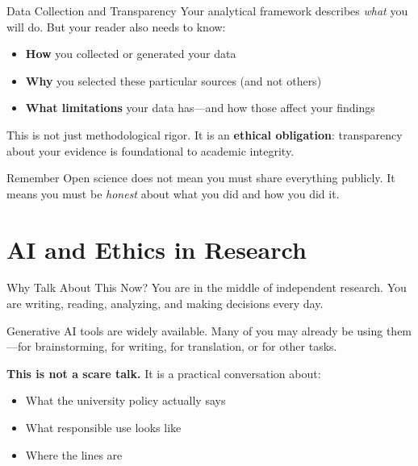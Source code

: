 \documentclass[aspectratio=169,11pt]{beamer}
\begin{document}
\begin{frame}{Data Collection and Transparency}
    Your analytical framework describes \textit{what} you will do. But your reader also needs to know:
    \vspace{0.3cm}
    \begin{itemize}
        \item \textbf{How} you collected or generated your data
        \item \textbf{Why} you selected these particular sources (and not others)
        \item \textbf{What limitations} your data has---and how those affect your findings
    \end{itemize}
    \vspace{0.3cm}
    This is not just methodological rigor. It is an \textbf{ethical obligation}: transparency about your evidence is foundational to academic integrity.
    \vspace{0.3cm}
    \begin{exampleblock}{Remember}
        Open science does not mean you must share everything publicly. It means you must be \textit{honest} about what you did and how you did it.
    \end{exampleblock}
\end{frame}

\section{AI and Ethics in Research}

\begin{frame}{Why Talk About This Now?}
    You are in the middle of independent research. You are writing, reading, analyzing, and making decisions every day.
    \vspace{0.5cm}

    Generative AI tools are widely available. Many of you may already be using them---for brainstorming, for writing, for translation, or for other tasks.
    \vspace{0.5cm}

    \textbf{This is not a scare talk.} It is a practical conversation about:
    \begin{itemize}
        \item What the university policy actually says
        \item What responsible use looks like
        \item Where the lines are
    \end{itemize}
\end{frame}
\end{document}
